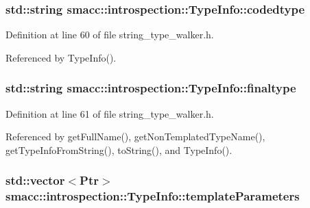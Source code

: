 \subsubsection[{\texorpdfstring{codedtype}{codedtype}}]{\setlength{\rightskip}{0pt plus 5cm}std\+::string smacc\+::introspection\+::\+Type\+Info\+::codedtype\hspace{0.3cm}{\ttfamily [private]}}\hypertarget{classsmacc_1_1introspection_1_1TypeInfo_a117d2b73994b78a6e4e81cdf7054912c}{}\label{classsmacc_1_1introspection_1_1TypeInfo_a117d2b73994b78a6e4e81cdf7054912c}


Definition at line 60 of file string\+\_\+type\+\_\+walker.\+h.



Referenced by Type\+Info().

\subsubsection[{\texorpdfstring{finaltype}{finaltype}}]{\setlength{\rightskip}{0pt plus 5cm}std\+::string smacc\+::introspection\+::\+Type\+Info\+::finaltype\hspace{0.3cm}{\ttfamily [private]}}\hypertarget{classsmacc_1_1introspection_1_1TypeInfo_aa4010ed427e12db443e08ab16a3de243}{}\label{classsmacc_1_1introspection_1_1TypeInfo_aa4010ed427e12db443e08ab16a3de243}


Definition at line 61 of file string\+\_\+type\+\_\+walker.\+h.



Referenced by get\+Full\+Name(), get\+Non\+Templated\+Type\+Name(), get\+Type\+Info\+From\+String(), to\+String(), and Type\+Info().

\subsubsection[{\texorpdfstring{template\+Parameters}{templateParameters}}]{\setlength{\rightskip}{0pt plus 5cm}std\+::vector$<${\bf Ptr}$>$ smacc\+::introspection\+::\+Type\+Info\+::template\+Parameters}\hypertarget{classsmacc_1_1introspection_1_1TypeInfo_aed5166ab8bcd94489e7bc87deb01de5c}{}\label{classsmacc_1_1introspection_1_1TypeInfo_aed5166ab8bcd94489e7bc87deb01de5c}


